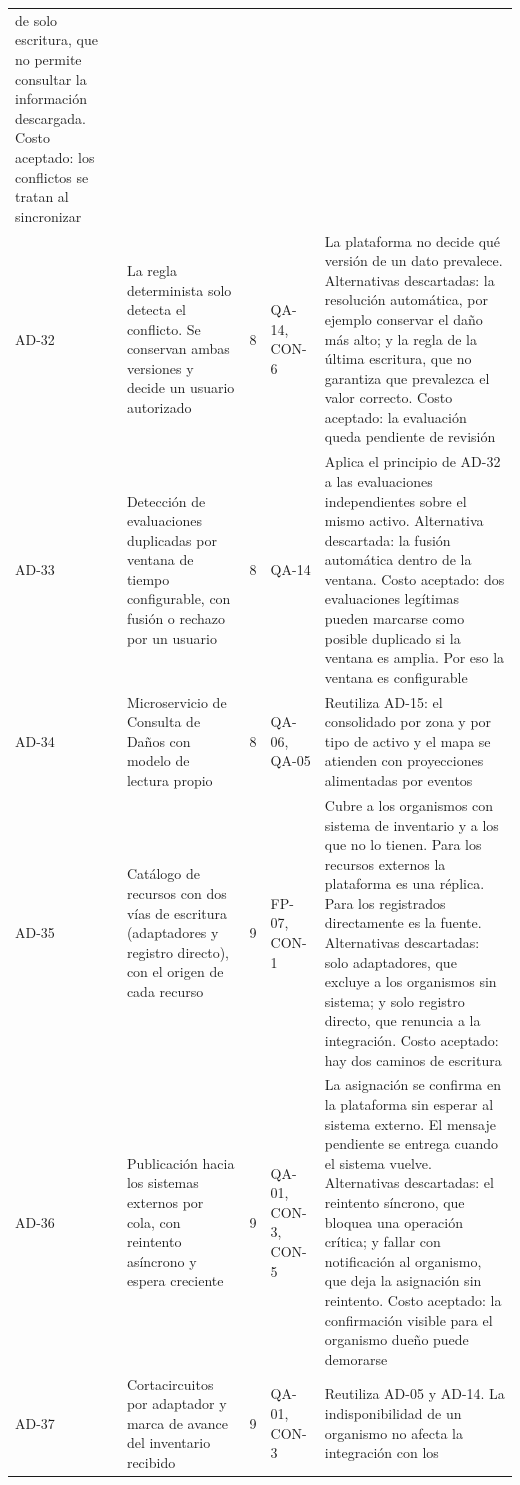 \documentclass[11pt,letterpaper]{article}
\begin{document}
\begin{longtable}{L{1.15cm} L{3.5cm} L{0.7cm} L{1.9cm} L{8.0cm}}
de solo escritura, que no permite consultar la información descargada. Costo aceptado: los
conflictos se tratan al sincronizar \\
AD-32 & La regla determinista solo detecta el conflicto. Se conservan ambas versiones y decide un
usuario autorizado & 8 & QA-14, CON-6 & La plataforma no decide qué versión de un dato prevalece.
Alternativas descartadas: la resolución automática, por ejemplo conservar el daño más alto; y la
regla de la última escritura, que no garantiza que prevalezca el valor correcto. Costo aceptado: la
evaluación queda pendiente de revisión \\
AD-33 & Detección de evaluaciones duplicadas por ventana de tiempo configurable, con fusión o
rechazo por un usuario & 8 & QA-14 & Aplica el principio de AD-32 a las evaluaciones independientes
sobre el mismo activo. Alternativa descartada: la fusión automática dentro de la ventana. Costo
aceptado: dos evaluaciones legítimas pueden marcarse como posible duplicado si la ventana es
amplia. Por eso la ventana es configurable \\
AD-34 & Microservicio de Consulta de Daños con modelo de lectura propio & 8 & QA-06, QA-05 &
Reutiliza AD-15: el consolidado por zona y por tipo de activo y el mapa se atienden con
proyecciones alimentadas por eventos \\
AD-35 & Catálogo de recursos con dos vías de escritura (adaptadores y registro directo), con el
origen de cada recurso & 9 & FP-07, CON-1 & Cubre a los organismos con sistema de inventario y a los
que no lo tienen. Para los recursos externos la plataforma es una réplica. Para los registrados
directamente es la fuente. Alternativas descartadas: solo adaptadores, que excluye a los organismos
sin sistema; y solo registro directo, que renuncia a la integración. Costo aceptado: hay dos caminos
de escritura \\
AD-36 & Publicación hacia los sistemas externos por cola, con reintento asíncrono y espera
creciente & 9 & QA-01, CON-3, CON-5 & La asignación se confirma en la plataforma sin esperar al
sistema externo. El mensaje pendiente se entrega cuando el sistema vuelve. Alternativas
descartadas: el reintento síncrono, que bloquea una operación crítica; y fallar con notificación al
organismo, que deja la asignación sin reintento. Costo aceptado: la confirmación visible para el
organismo dueño puede demorarse \\
AD-37 & Cortacircuitos por adaptador y marca de avance del inventario recibido & 9 & QA-01, CON-3 &
Reutiliza AD-05 y AD-14. La indisponibilidad de un organismo no afecta la integración con los

\end{longtable}
\end{document}
